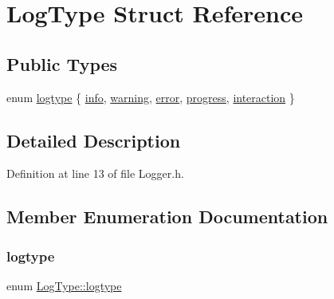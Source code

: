 \hypertarget{struct_log_type}{}\section{Log\+Type Struct Reference}
\label{struct_log_type}
\subsection*{Public Types}
\begin{DoxyCompactItemize}
\item 
enum \hyperlink{struct_log_type_a42f5153a559d41c697e4763ed36ff217}{logtype} \{ \newline
\hyperlink{struct_log_type_a42f5153a559d41c697e4763ed36ff217af6cbcad76cc2c860c206cefe43716a6b}{info}, 
\hyperlink{struct_log_type_a42f5153a559d41c697e4763ed36ff217af479132e55c523158544cc5c059bc9be}{warning}, 
\hyperlink{struct_log_type_a42f5153a559d41c697e4763ed36ff217af7be1f9d57d8054ac42608401faebff7}{error}, 
\hyperlink{struct_log_type_a42f5153a559d41c697e4763ed36ff217aaf0ab04c6e780051a63639d0df57eb20}{progress}, 
\newline
\hyperlink{struct_log_type_a42f5153a559d41c697e4763ed36ff217a53f06005557a25a49c105c26c34e8a6c}{interaction}
 \}
\end{DoxyCompactItemize}


\subsection{Detailed Description}


Definition at line 13 of file Logger.\+h.



\subsection{Member Enumeration Documentation}
\mbox{\label{struct_log_type_a42f5153a559d41c697e4763ed36ff217}} 
\subsubsection{\texorpdfstring{logtype}{logtype}}
{\footnotesize\ttfamily enum \hyperlink{struct_log_type_a42f5153a559d41c697e4763ed36ff217}{Log\+Type\+::logtype}}

